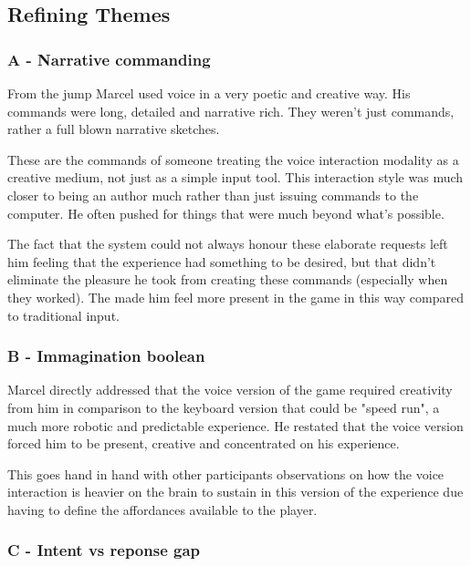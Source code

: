\subsection{Refining Themes}

\subsubsection{A - Narrative commanding}

From the jump Marcel used voice in a very poetic and creative way. His commands were long, detailed and narrative rich. They weren't just commands, rather a full blown narrative sketches. 


These are the commands of someone treating the voice interaction modality as a creative medium, not just as a simple input tool. 
This interaction style was much closer to being an author much rather than just issuing commands to the computer. He often pushed for things that were much beyond what's possible.

The fact that the system could not always honour these elaborate requests left him feeling that the experience had something to be desired, but that didn't eliminate the pleasure he took from creating these commands (especially when they worked). The made him feel more present in the game in this way compared to traditional input.




\subsubsection{B - Immagination boolean}



Marcel directly addressed that the voice version of the game required creativity from him in comparison to the keyboard version that could be "speed run", a much more robotic and predictable experience. He restated that the voice version forced him to be present, creative and concentrated on his experience. 

This goes hand in hand with other participants observations on how the voice interaction is heavier on the brain to sustain in this version of the experience due having to define the affordances available to the player. 


\subsubsection{C - Intent vs reponse gap}


